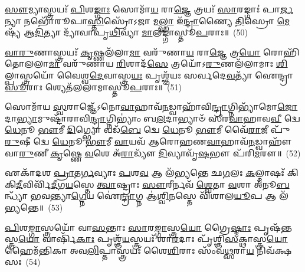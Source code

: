 \-\ul{𑌸𑍗}\-𑌮𑍍𑌯𑌾𑌸𑍍𑌤𑍍𑌰𑌯𑌃᳴ \ul{𑌪𑌿}\-𑌶\-\ul{𑌙𑍍𑌗𑌾𑌃} 𑌸𑍋𑌮𑌾᳴\-\ul{𑌯} 𑌰𑌾\-\ul{𑌜𑍍𑌞𑍇} 𑌤𑍍𑌰𑌯𑌃᳴ \ul{𑌸𑌾}\-𑌰𑌙𑍍𑌗𑌾𑌃॑ 𑌪𑌾\-\ul{𑌰𑍍𑌜}\-𑌨𑍍𑌯𑌾 𑌨𑌭𑍋᳴𑌰𑍂𑌪𑌾\-\ul{𑌸𑍍𑌤𑌿}\-𑌸𑍍𑌰𑍋᳴\-𑌽𑌜𑌾 \ul{𑌮}\-\-\ul{𑌲𑍍}\-\mbox{}𑌹𑌾 𑌇᳴\-\ul{𑌨𑍍𑌦𑍍𑌰𑌾}\-𑌣𑍍𑌯𑍈 \ul{𑌤𑌿}\-𑌸𑍍𑌰𑍋 \ul{𑌮𑍇}\-𑌷𑍍𑌯᳴ 𑌆\-\ul{𑌦𑌿}\-𑌤𑍍𑌯𑌾 𑌦𑍍𑌯𑌾᳴𑌵𑌾𑌪𑍃\-\ul{𑌥𑌿}\-𑌵𑍍𑌯𑌾᳴ \ul{𑌮𑌾}\-𑌲𑌙𑍍𑌗𑌾॑𑌸𑍍𑌤𑍂\-\ul{𑌪}\-𑌰𑌾𑌃॥~(50)

{\anuvakamend[{\-\ul{𑌸𑍗}\-𑌮𑍍𑌯𑌾 𑌏\-\ul{𑌕𑌾}\-𑌨𑍍𑌨𑌵𑌿𑍞᳴𑌶𑌤𑌿𑌃}]}%

\-\ul{𑌵𑌾}\-\-\ul{𑌰𑍁}\-𑌣𑌾𑌸𑍍𑌤𑍍𑌰𑌯𑌃᳴ \ul{𑌕𑍃}\-𑌷𑍍𑌣𑌲᳴𑌲𑌾\-\ul{𑌮𑌾} 𑌵𑌰𑍁᳴𑌣𑌾\-\ul{𑌯} 𑌰𑌾\-\ul{𑌜𑍍𑌞𑍇} 𑌤𑍍𑌰\-\ul{𑌯𑍋} 𑌰𑍋𑌹𑌿᳴𑌤𑍋𑌲𑌲𑌾\-\ul{𑌮𑌾} 𑌵𑌰𑍁᳴𑌣𑌾𑌯 \ul{𑌰𑌿}\-𑌶𑌾𑌦᳴\-\ul{𑌸𑍇} 𑌤𑍍𑌰𑌯𑍋᳴\-𑌽\-\ul{𑌰𑍁}\-𑌣𑌲᳴𑌲𑌾𑌮𑌾𑌃 \ul{𑌶𑌿}\-𑌲𑍍𑌪𑌾𑌸𑍍𑌤𑍍𑌰𑌯𑍋᳴ 𑌵𑍈𑌶𑍍𑌵\-\ul{𑌦𑍇}\-𑌵𑌾𑌸𑍍𑌤𑍍𑌰\-\ul{𑌯𑌃} 𑌪𑍃𑌶𑍍𑌞᳴𑌯𑌃 𑌸𑌰𑍍𑌵𑌦𑍇\-\ul{𑌵}\-𑌤𑍍𑌯𑌾᳴ 𑌐𑌨𑍍𑌦𑍍𑌰𑌾\-\ul{𑌸𑍂}\-𑌰𑌾𑌃 𑌶𑍍𑌯𑍇𑌤᳴𑌲𑌲𑌾𑌮𑌾𑌸𑍍𑌤𑍂\-\ul{𑌪}\-𑌰𑌾𑌃॥~(51)

{\anuvakamend[{\-\ul{𑌵𑌾}\-\-\ul{𑌰𑍁}\-𑌣𑌾 𑌵𑌿𑍞᳴\-\ul{𑌶}\-𑌤𑌿𑌃}]}%

𑌸𑍋𑌮𑌾᳴𑌯 \ul{𑌸𑍍𑌵}\-𑌰𑌾𑌜𑍍𑌞𑍇᳴\-𑌽𑌨𑍋\-\ul{𑌵𑌾}\-𑌹𑌾𑌵᳴\-\ul{𑌨}\-𑌡𑍍𑌵𑌾𑌹𑌾᳴𑌵𑌿\-\ul{𑌨𑍍𑌦𑍍𑌰𑌾}\-𑌗𑍍𑌨𑌿𑌭𑍍𑌯𑌾᳴𑌮𑍋\-\ul{𑌜𑍋}\-𑌦𑌾\-\ul{𑌭𑍍𑌯𑌾}\-𑌮𑍁𑌷𑍍𑌟𑌾᳴𑌰𑌾𑌵𑌿\-\ul{𑌨𑍍𑌦𑍍𑌰𑌾}\-𑌗𑍍𑌨𑌿\-𑌭𑍍𑌯𑌾𑌂॑ 𑌬\-\ul{𑌲}\-𑌦𑌾𑌭𑍍𑌯𑌾𑍞᳴ 𑌸𑍀𑌰\-\ul{𑌵𑌾}\-𑌹𑌾𑌵\-\ul{𑌵𑍀} 𑌦𑍍𑌵𑍇 \ul{𑌧𑍇}\-𑌨𑍂 \ul{𑌭𑍗}\-𑌮𑍀 \ul{𑌦𑌿}\-𑌗𑍍𑌭𑍍𑌯𑍋 𑌵𑌡᳴\-\ul{𑌬𑍇} 𑌦𑍍𑌵𑍇 \ul{𑌧𑍇}\-𑌨𑍂 \ul{𑌭𑍗}\-𑌮𑍀 𑌵𑍈᳴\-\ul{𑌰𑌾}\-𑌜𑍀 𑌪𑍁᳴\-\ul{𑌰𑍁}\-𑌷𑍀 𑌦𑍍𑌵𑍇 \ul{𑌧𑍇}\-𑌨𑍂 \ul{𑌭𑍗}\-𑌮𑍀 \ul{𑌵𑌾}\-𑌯𑌵᳴ 𑌆𑌰𑍋𑌹𑌣\-\ul{𑌵𑌾}\-𑌹𑌾𑌵᳴\-\ul{𑌨}\-𑌡𑍍𑌵𑌾𑌹𑍗᳴ 𑌵𑌾\-\ul{𑌰𑍁}\-𑌣𑍀 \ul{𑌕𑍃}\-𑌷𑍍𑌣𑍇 \ul{𑌵}\-𑌶𑍇 𑌅᳴\-\ul{𑌰𑌾}\-𑌡𑍍𑌯𑍗᳴ \ul{𑌦𑌿}\-𑌵𑍍𑌯𑌾𑌵𑍃᳴\-\ul{𑌷}\-𑌭𑍗 𑌪᳴𑌰𑌿\-\ul{𑌮}\-𑌰𑍗॥~(52)

{\anuvakamend[{𑌸𑍋𑌮𑌾᳴𑌯 \ul{𑌸𑍍𑌵}\-𑌰𑌾\-\ul{𑌜𑍍𑌞𑍇} 𑌚𑌤𑍁᳴𑌸𑍍𑌤𑍍𑌰𑌿𑍞𑌶𑌤𑍍}]}%

𑌏𑌕𑌾᳴\-𑌦𑌶 \ul{𑌪𑍍𑌰𑌾}\-𑌤\-\ul{𑌰𑍍𑌗}\-𑌵𑍍𑌯𑌾𑌃 \ul{𑌪}\-𑌶\-\ul{𑌵} 𑌆 𑌲᳴𑌭𑍍𑌯𑌨𑍍𑌤𑍇 𑌛\-\ul{𑌗}\-𑌲𑌃 \ul{𑌕}\-𑌲𑍍𑌮𑌾𑌷𑌃᳴ 𑌕𑌿𑌕𑌿\-\ul{𑌦𑍀}\-𑌵𑌿𑌰𑍍𑌵𑌿᳴\-\ul{𑌦𑍀}\-𑌗\-\ul{𑌯}\-𑌸𑍍𑌤𑍇 \ul{𑌤𑍍𑌵𑌾}\-𑌷𑍍𑌟𑍍𑌰𑌾𑌃 \ul{𑌸𑍗}\-𑌰𑍀𑌰𑍍𑌨𑌵᳴ \ul{𑌶𑍍𑌵𑍇}\-𑌤𑌾 \ul{𑌵}\-𑌶𑌾 𑌅᳴𑌨𑍂\-\ul{𑌬}\-𑌨𑍍𑌧𑍍𑌯𑌾᳴ 𑌭𑌵𑌨𑍍𑌤𑍍𑌯𑌾\-\ul{𑌗𑍍𑌨𑍇}\-𑌯 𑌐॑\-\ul{𑌨𑍍𑌦𑍍𑌰𑌾}\-𑌗𑍍𑌨 𑌆॑\-\ul{𑌶𑍍𑌵𑌿}\-𑌨𑌸𑍍𑌤𑍇 𑌵𑌿᳴𑌶𑌾𑌲\-\ul{𑌯𑍂}\-𑌪 𑌆 𑌲᳴𑌭𑍍𑌯𑌨𑍍𑌤𑍇॥~(53)

{\anuvakamend[{𑌏𑌕𑌾᳴\-𑌦\-\ul{𑌶} 𑌪𑌞𑍍𑌚᳴𑌵𑌿𑍞𑌶𑌤𑌿𑌃}]}%

\-\ul{𑌪𑌿}\-𑌶\-\ul{𑌙𑍍𑌗𑌾}\-𑌸𑍍𑌤𑍍𑌰𑌯𑍋᳴ 𑌵𑌾\-\ul{𑌸}\-𑌨𑍍𑌤𑌾𑌃 \ul{𑌸𑌾}\-𑌰\-\ul{𑌙𑍍𑌗𑌾}\-𑌸𑍍𑌤𑍍𑌰\-\ul{𑌯𑍋} 𑌗𑍍𑌰𑍈\-\ul{𑌷𑍍𑌮𑌾𑌃} 𑌪𑍃𑌷᳴\-\ul{𑌨𑍍𑌤}\-𑌸𑍍𑌤𑍍𑌰\-\ul{𑌯𑍋} 𑌵𑌾𑌰𑍍\mbox{}𑌷𑌿᳴\-\ul{𑌕𑌾𑌃} 𑌪𑍃𑌶𑍍𑌞᳴\-\ul{𑌯}\-𑌸𑍍𑌤𑍍𑌰𑌯𑌃᳴ 𑌶𑌾\-\ul{𑌰}\-𑌦𑌾𑌃 𑌪𑍃᳴𑌶𑍍𑌞𑌿\-\ul{𑌸}\-𑌕𑍍𑌥𑌾𑌸𑍍𑌤𑍍𑌰\-\ul{𑌯𑍋} 𑌹𑍈𑌮᳴𑌨𑍍𑌤𑌿𑌕𑌾 𑌅𑌵\-\ul{𑌲𑌿}\-𑌪𑍍𑌤𑌾𑌸𑍍𑌤𑍍𑌰𑌯𑌃᳴ 𑌶𑍈\-\ul{𑌶𑌿}\-𑌰𑌾𑌃 𑌸𑌂᳴𑌵\-\ul{𑌥𑍍𑌸}\-𑌰𑌾\-\ul{𑌯} 𑌨𑌿𑌵᳴𑌕𑍍𑌷𑌸𑌃~(54)


{\anuvakamend[{\-\ul{𑌪𑌿}\-𑌶𑌙𑍍𑌗𑌾᳴ 𑌵𑌿𑍞\-\ul{𑌶}\-𑌤𑌿𑌃}]}%

